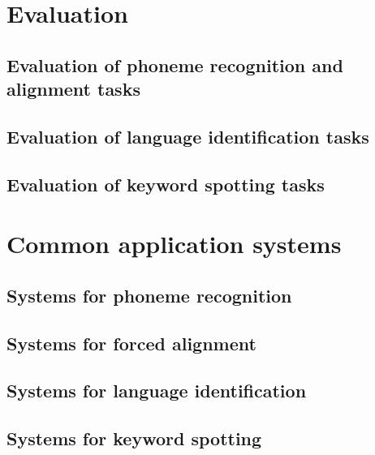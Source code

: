 \section{Evaluation}
\subsection{Evaluation of phoneme recognition and alignment tasks}
\subsection{Evaluation of language identification tasks}
\subsection{Evaluation of keyword spotting tasks}
\section{Common application systems}
\subsection{Systems for phoneme recognition}
\subsection{Systems for forced alignment}
\subsection{Systems for language identification}
\subsection{Systems for keyword spotting}




